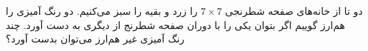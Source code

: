 \EXERCISE
دو تا از خانه‌های صفحه شطرنجی
$7\times7$
را زرد و بقیه را سبز می‌کنیم. دو رنگ آمیزی را هم‌ارز گوییم اگر بتوان یکی را با دوران صفحه شطرنج از دیگری به دست آورد. چند رنگ آمیزی غیر هم‌ارز می‌توان بدست آورد؟